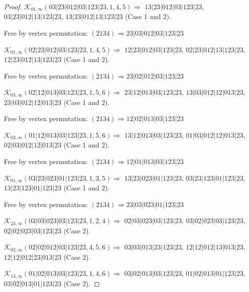 \documentclass[12pt]{article}
\theoremstyle{plain}
\theoremstyle{definition}
\theoremstyle{remark}
\newcommand{\fancy}[1]{\mathcal{#1}}
\def\K{\fancy{K}}
\begin{document}
\begin{proof}
	\bigskip
	
	$\K_{01,\infty}(03|23|012|03|123|23,1, 4, 5)\Rightarrow $ $13|23|012|03|123|23$, $03|23|012|13|123|23$, $13|23|012|13|123|23$ (Case 1 and 2).
	
	
	
	Free by vertex permutation: $(2 1 3 4)\Rightarrow 23|03|012|03|123|23$
	
	
	\bigskip
	
	$\K_{01,\infty}(02|23|012|03|123|23,1, 4, 5)\Rightarrow $ $12|23|012|03|123|23$, $02|23|012|13|123|23$, $12|23|012|13|123|23$ (Case 1 and 2).
	
	
	
	Free by vertex permutation: $(2 1 3 4)\Rightarrow 23|02|012|03|123|23$
	
	
	\bigskip
	
	$\K_{03,\infty}(02|12|013|03|123|23,1, 5, 6)\Rightarrow $ $23|12|013|03|123|23$, $13|03|012|12|013|23$, $23|03|012|12|013|23$ (Case 1 and 2).
	
	
	
	Free by vertex permutation: $(2 1 3 4)\Rightarrow 12|02|013|03|123|23$
	
	
	\bigskip
	
	$\K_{03,\infty}(01|12|013|03|123|23,1, 5, 6)\Rightarrow $ $13|12|013|03|123|23$, $01|03|012|12|013|23$, $02|03|012|12|013|23$ (Case 1 and 2).
	
	
	
	Free by vertex permutation: $(2 1 3 4)\Rightarrow 12|01|013|03|123|23$
	
	
	\bigskip
	
	$\K_{01,\infty}(03|23|023|01|123|23,1, 3, 5)\Rightarrow $ $13|23|023|01|123|23$, $03|23|123|01|123|23$, $13|23|123|01|123|23$ (Case 1 and 2).
	
	
	
	Free by vertex permutation: $(2 1 3 4)\Rightarrow 23|03|023|01|123|23$
	
	
	\bigskip
	
	$\K_{23,\infty}(03|03|023|03|123|23,1, 2, 4)\Rightarrow $ $02|03|023|03|123|23$, $03|02|023|03|123|23$, $02|02|023|03|123|23$ (Case 2).
	
	\bigskip
	
	$\K_{02,\infty}(02|02|012|03|123|23,4, 5, 6)\Rightarrow $ $03|03|013|23|123|23$, $12|12|012|13|013|23$, $12|12|012|23|013|23$ (Case 2).
	
	\bigskip
	
	$\K_{13,\infty}(01|02|013|03|123|23,1, 4, 6)\Rightarrow $ $03|02|013|03|123|23$, $01|02|013|01|123|23$, $03|02|013|01|123|23$ (Case 2).
	

\end{proof}
\end{document}
